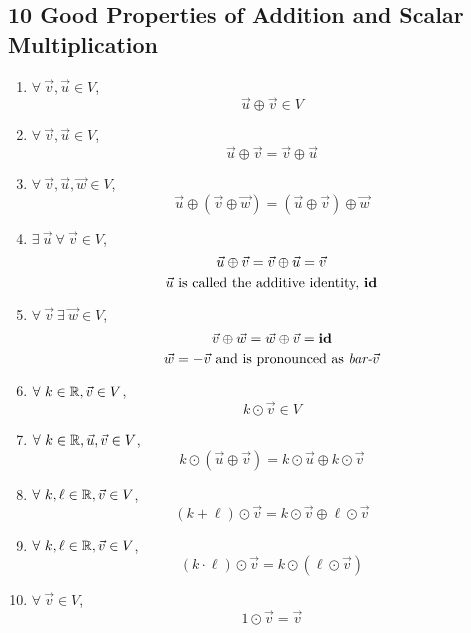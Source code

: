 \subsection*{10 Good Properties of Addition and Scalar Multiplication}
\begin{enumerate}
  \item {} $\forall~\vec{v}, \vec{u} \in V$,
        \[
          \vec{u} \oplus \vec{v} \in V
        \]
  \item {} $\forall~\vec{v}, \vec{u} \in V$,
        \[
          \vec{u} \oplus \vec{v} = \vec{v} \oplus \vec{u}
        \]
  \item {} $\forall~\vec{v}, \vec{u}, \vec{w} \in V$,
        \[
          \vec{u} \oplus (\vec{v} \oplus \vec{w}) = (\vec{u} \oplus \vec{v}) \oplus \vec{w}
        \]
  \item {} $\exists~\vec{u}~\forall~\vec{v} \in V$,
        \[
          \vec{u} \oplus \vec{v} = \vec{v} \oplus \vec{u} = \vec{v} \\
        \]
        \[
          \vec{u}~\text{is called the additive identity, \textbf{id}}
        \]
  \item {} $\forall~\vec{v}~\exists~\vec{w} \in V$,
        \[
          \vec{v} \oplus \vec{w} = \vec{w} \oplus \vec{v} = \text{\textbf{id}}
        \]
        \[
          \vec{w} = -\vec{v}~\text{and is pronounced as \textit{bar-$\vec{v}$}}
        \]
  \item {} $\forall~k \in \mathbb{R}, \vec{v} \in V$,
        \[
          k \odot \vec{v} \in V
        \]
  \item {} $\forall~k \in \mathbb{R}, \vec{u}, \vec{v} \in V$,
        \[
          k \odot (\vec{u} \oplus \vec{v}) = k \odot \vec{u} \oplus k \odot \vec{v}
        \]
  \item {} $\forall~k, \ell \in \mathbb{R}, \vec{v} \in V$,
        \[
          (k + \ell) \odot \vec{v} = k \odot \vec{v} \oplus \ell \odot \vec{v}
        \]
  \item {} $\forall~k, \ell \in \mathbb{R}, \vec{v} \in V$,
        \[
          (k \cdot \ell) \odot \vec{v} = k \odot (\ell \odot \vec{v})
        \]
  \item {} $\forall~\vec{v} \in V$,
        \[
          1 \odot \vec{v} = \vec{v}
        \]
\end{enumerate}
